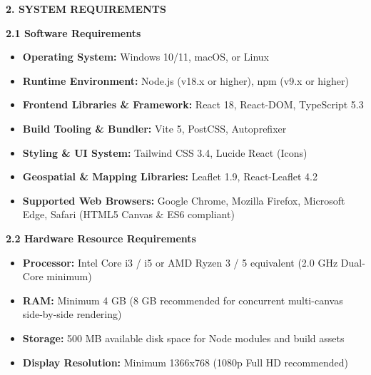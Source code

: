 \documentclass[12pt, a4paper]{article}
\begin{document}
\newpage

\setcounter{page}{4}

\begin{center}
    {\Large \textbf{2. SYSTEM REQUIREMENTS}}
\end{center}
\vspace{0.3cm}

\textbf{2.1 Software Requirements}

\begin{itemize}[leftmargin=2em, itemsep=6pt]
    \item \textbf{Operating System:} Windows 10/11, macOS, or Linux
    \item \textbf{Runtime Environment:} Node.js (v18.x or higher), npm (v9.x or higher)
    \item \textbf{Frontend Libraries \& Framework:} React 18, React-DOM, TypeScript 5.3
    \item \textbf{Build Tooling \& Bundler:} Vite 5, PostCSS, Autoprefixer
    \item \textbf{Styling \& UI System:} Tailwind CSS 3.4, Lucide React (Icons)
    \item \textbf{Geospatial & Mapping Libraries:} Leaflet 1.9, React-Leaflet 4.2
    \item \textbf{Supported Web Browsers:} Google Chrome, Mozilla Firefox, Microsoft Edge, Safari (HTML5 Canvas & ES6 compliant)
\end{itemize}

\vspace{0.4cm}
\textbf{2.2 Hardware Resource Requirements}

\begin{itemize}[leftmargin=2em, itemsep=6pt]
    \item \textbf{Processor:} Intel Core i3 / i5 or AMD Ryzen 3 / 5 equivalent (2.0 GHz Dual-Core minimum)
    \item \textbf{RAM:} Minimum 4 GB (8 GB recommended for concurrent multi-canvas side-by-side rendering)
    \item \textbf{Storage:} 500 MB available disk space for Node modules and build assets
    \item \textbf{Display Resolution:} Minimum 1366x768 (1080p Full HD recommended)
\end{itemize}

\newpage

\setcounter{page}{5}
\end{document}
